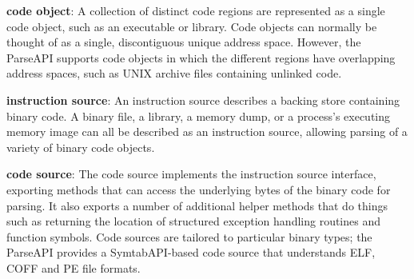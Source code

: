 %
\begin{itemize}[leftmargin=0pt,label=$\circ$]

{\item \textbf{code object}: A collection of distinct code regions are represented as a single code object, such as an executable or library. Code objects can normally be thought of as a single, discontiguous unique address space. However, the ParseAPI supports code objects in which the different regions have overlapping address spaces, such as UNIX archive files containing unlinked code.
}%

{\item \textbf{instruction source}: An instruction source describes a backing store containing binary code. A binary file, a library, a memory dump, or a process's executing memory image can all be described as an instruction source, allowing parsing of a variety of binary code objects.
}%

{\item \textbf{code source}: The code source implements the instruction source interface, exporting methods that can access the underlying bytes of the binary code for parsing. It also exports a number of additional helper methods that do things such as returning the location of structured exception handling routines and function symbols. Code sources are tailored to particular binary types; the ParseAPI provides a SymtabAPI-based code source that understands ELF, COFF and PE file formats.
}%

\end{itemize}
